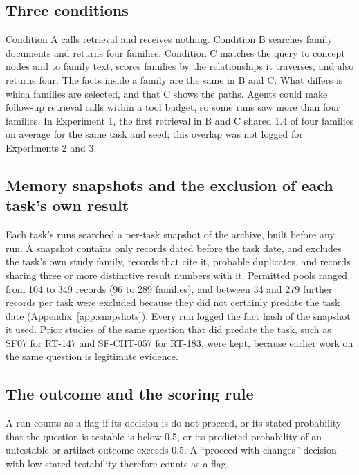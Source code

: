 \documentclass[11pt]{article}
\begin{document}
\subsection{Three conditions}

Condition A calls retrieval and receives nothing. Condition B searches family documents and returns four families. Condition C matches the query to concept nodes and to family text, scores families by the relationships it traverses, and also returns four. The facts inside a family are the same in B and C. What differs is which families are selected, and that C shows the paths. Agents could make follow-up retrieval calls within a tool budget, so some runs saw more than four families. In Experiment 1, the first retrieval in B and C shared 1.4 of four families on average for the same task and seed; this overlap was not logged for Experiments 2 and 3.

\subsection{Memory snapshots and the exclusion of each task's own result}

Each task's runs searched a per-task snapshot of the archive, built before any run. A snapshot contains only records dated before the task date, and excludes the task's own study family, records that cite it, probable duplicates, and records sharing three or more distinctive result numbers with it. Permitted pools ranged from 104 to 349 records (96 to 289 families), and between 34 and 279 further records per task were excluded because they did not certainly predate the task date (Appendix~\ref{app:snapshots}). Every run logged the fact hash of the snapshot it used. Prior studies of the same question that did predate the task, such as SF07 for RT-147 and SF-CHT-057 for RT-183, were kept, because earlier work on the same question is legitimate evidence.

\subsection{The outcome and the scoring rule}
\label{sec:outcome}

A run counts as a flag if its decision is do not proceed, or its stated probability that the question is testable is below 0.5, or its predicted probability of an untestable or artifact outcome exceeds 0.5. A ``proceed with changes'' decision with low stated testability therefore counts as a flag.
\end{document}
